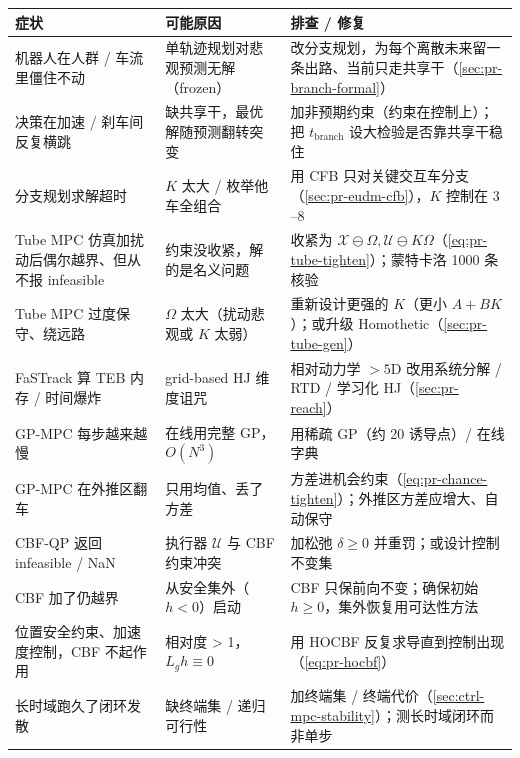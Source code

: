 \begin{table}[H]\centering\small
\begin{tabular}{p{}p{}p{}}
\toprule
症状 & 可能原因 & 排查 / 修复 \\
\midrule
机器人在人群 / 车流里僵住不动 & 单轨迹规划对悲观预测无解（frozen） & 改分支规划，为每个离散未来留一条出路、当前只走共享干（\cref{sec:pr-branch-formal}） \\
决策在加速 / 刹车间反复横跳 & 缺共享干，最优解随预测翻转突变 & 加非预期约束（约束在控制上）；把 $t_{\mathrm{branch}}$ 设大检验是否靠共享干稳住 \\
分支规划求解超时 & $K$ 太大 / 枚举他车全组合 & 用 CFB 只对关键交互车分支（\cref{sec:pr-eudm-cfb}），$K$ 控制在 $3$--$8$ \\
Tube MPC 仿真加扰动后偶尔越界、但从不报 infeasible & 约束没收紧，解的是名义问题 & 收紧为 $\mathcal{X}\ominus\Omega,\mathcal{U}\ominus K\Omega$（\cref{eq:pr-tube-tighten}）；蒙特卡洛 1000 条核验 \\
Tube MPC 过度保守、绕远路 & $\Omega$ 太大（扰动悲观或 $K$ 太弱） & 重新设计更强的 $K$（更小 $A+BK$）；或升级 Homothetic（\cref{sec:pr-tube-gen}） \\
FaSTrack 算 TEB 内存 / 时间爆炸 & grid-based HJ 维度诅咒 & 相对动力学 $>5$D 改用系统分解 / RTD / 学习化 HJ（\cref{sec:pr-reach}） \\
GP-MPC 每步越来越慢 & 在线用完整 GP，$O(N^3)$ & 用稀疏 GP（约 20 诱导点）/ 在线字典 \\
GP-MPC 在外推区翻车 & 只用均值、丢了方差 & 方差进机会约束（\cref{eq:pr-chance-tighten}）；外推区方差应增大、自动保守 \\
CBF-QP 返回 infeasible / NaN & 执行器 $\mathcal{U}$ 与 CBF 约束冲突 & 加松弛 $\delta\ge0$ 并重罚；或设计控制不变集 \\
CBF 加了仍越界 & 从安全集外（$h<0$）启动 & CBF 只保前向不变；确保初始 $h\ge0$，集外恢复用可达性方法 \\
位置安全约束、加速度控制，CBF 不起作用 & 相对度 > 1，$L_g h\equiv0$ & 用 HOCBF 反复求导直到控制出现（\cref{eq:pr-hocbf}） \\
长时域跑久了闭环发散 & 缺终端集 / 递归可行性 & 加终端集 / 终端代价（\cref{sec:ctrl-mpc-stability}）；测长时域闭环而非单步 \\
\bottomrule
\end{tabular}
\end{table}
